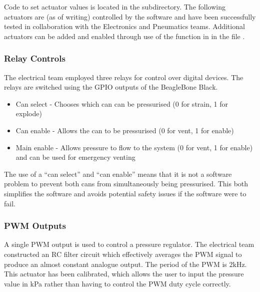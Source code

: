 Code to set actuator values is located in the  subdirectory. The following actuators are (as of writing) controlled by the software and have been successfully tested in collaboration with the Electronics and Pneumatics teams. Additional actuators can be added and enabled through use of the  function in  in the file .

\subsubsection{Relay Controls}

The electrical team employed three relays for control over digital devices. The relays are switched using the GPIO outputs of the BeagleBone Black.

\begin{itemize}
	\item Can select - Chooses which can can be pressurised (0 for strain, 1 for explode)
	\item Can enable - Allows the can to be pressurised (0 for vent, 1 for enable)
	\item Main enable - Allows pressure to flow to the system (0 for vent, 1 for enable) and can be used for emergency venting
\end{itemize}

The use of a ``can select'' and ``can enable'' means that it is not a software problem to prevent both cans from simultaneously being pressurised. This both simplifies the software and avoids potential safety issues if the software were to fail.


\subsubsection{PWM Outputs}

A single PWM output is used to control a pressure regulator. The electrical team constructed an RC filter circuit which effectively averages the PWM signal to produce an almost constant analogue output. The period of the PWM is $2\text{kHz}$. This actuator has been calibrated, which allows the user to input the pressure value in kPa rather than having to control the PWM duty cycle correctly.


